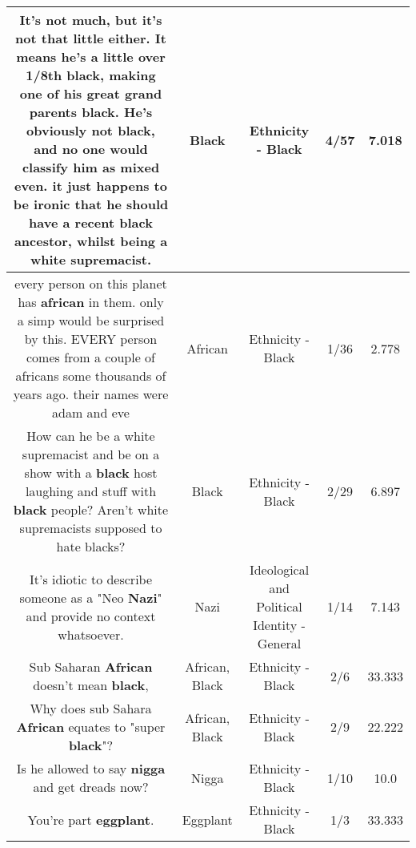 \documentclass[11pt]{article}
\newlength\mylength
\begin{document}
\begin{center}
\begin{longtable}{|C{.65\mylength}|C{.30\mylength}|C{.12\mylength}|C{.12\mylength}|C{.12\mylength}|}
  \small It's not much, but it's not that little either. It means he's a little over 1/8th \textbf{black}, making one of his great grand parents \textbf{black}. He's obviously not \textbf{black}, and no one would classify him as mixed even. it just happens to be ironic that he should have a recent \textbf{black} ancestor, whilst being a white supremacist.\normalsize   & Black & Ethnicity - Black & 4/57 & 7.018 \\  \hline
  \small every person on this planet has \textbf{african} in them. only a simp would be surprised by this. EVERY person comes from a couple of africans some thousands of years ago. their names were adam and eve\normalsize   & African & Ethnicity - Black & 1/36 & 2.778 \\  \hline
  \small How can he be a white supremacist and be on a show with a \textbf{black} host laughing and stuff with \textbf{black} people? Aren't white supremacists supposed to hate blacks?\normalsize   & Black & Ethnicity - Black & 2/29 & 6.897 \\  \hline
  \small It's idiotic to describe someone as a "Neo \textbf{Nazi}" and provide no context whatsoever.\normalsize   & Nazi &  Ideological and Political Identity - General & 1/14 & 7.143 \\  \hline
  \small Sub Saharan \textbf{African} doesn't mean \textbf{black},\normalsize   & African, Black & Ethnicity - Black & 2/6 & 33.333 \\  \hline
  \small Why does sub Sahara \textbf{African} equates to "super \textbf{black}"?\normalsize   & African, Black & Ethnicity - Black & 2/9 & 22.222 \\  \hline
  \small Is he allowed to say \textbf{nigga} and get dreads now?\normalsize   & Nigga & Ethnicity - Black & 1/10 & 10.0 \\  \hline
  \small You're part \textbf{eggplant}.\normalsize   & Eggplant & Ethnicity - Black & 1/3 & 33.333 \\  \hline

\end{longtable}
\end{center}
\end{document}
